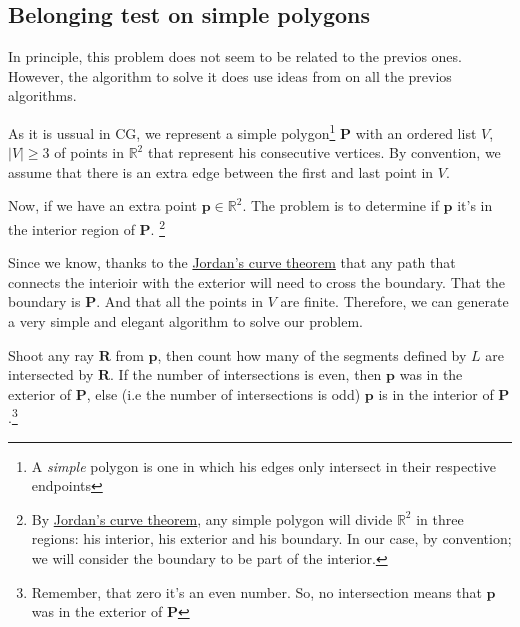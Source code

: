 {\centering
\begin{minipage}{\linewidth}
\end{minipage}
\par
}

\subsection{Belonging test on simple polygons}
\label{sec:belongTest}

In principle, this problem does not seem to be related to the previos ones.
However, the algorithm to solve it does use ideas from on all the previos algorithms.

As it is ussual in CG, we represent a simple polygon\footnote{A \emph{simple} polygon is one in which his edges only intersect in their respective endpoints} $\mathbf{P}$ with an ordered list $V$, $|V| \geq 3$ of points in $\mathbb{R}^2$ that represent his consecutive vertices.
By convention, we assume that there is an extra edge between the first and last point in $V$.

Now, if we have an extra point $\mathbf{p} \in \mathbb{R}^2$.
The problem is to determine if $\mathbf{p}$ it's in the interior region of $\mathbf{P}$.
\footnote{By \href{https://en.wikipedia.org/wiki/Jordan_curve_theorem}{Jordan's curve theorem}, any simple polygon will divide $\mathbb{R}^2$ in three regions: his interior, his exterior and his boundary. In our case, by convention; we will consider the boundary to be part of the interior.}

Since we know, thanks to the \href{https://en.wikipedia.org/wiki/Jordan_curve_theorem}{Jordan's curve theorem} that any path that connects the interioir with the exterior will need to cross the boundary.
That the boundary is $\mathbf{P}$.
And that all the points in $V$ are finite. 
Therefore, we can generate a very simple and elegant algorithm to solve our problem.

Shoot any ray $\mathbf{R}$ from $\mathbf{p}$, then count how many of the segments defined by $L$ are intersected by $\mathbf{R}$. 
If the number of intersections is even, then $\mathbf{p}$ was in the exterior of $\mathbf{P}$, else (i.e the number of intersections is odd) $\mathbf{p}$ is in the interior of $\mathbf{P}$.\footnote{Remember, that zero it's an even number. So, no intersection means that $\mathbf{p}$ was in the exterior of $\mathbf{P}$}


